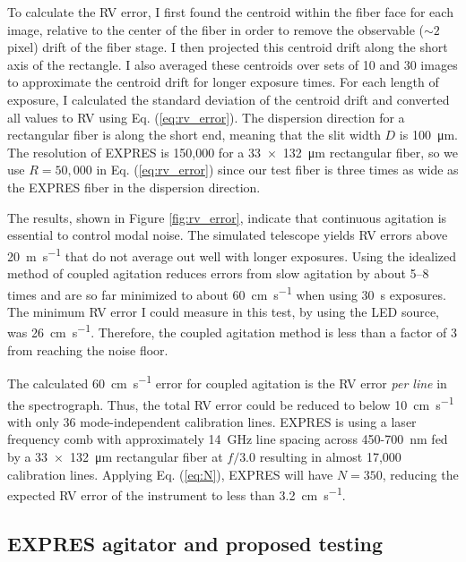 \documentclass[11pt]{article}
\begin{document}
To calculate the RV error, I first found the centroid within the fiber face for each image, relative to the center of the fiber in order to remove the observable ($\sim 2$ pixel) drift of the fiber stage. I then projected this centroid drift along the short axis of the rectangle. I also averaged these centroids over sets of 10 and 30 images to approximate the centroid drift for longer exposure times. For each length of exposure, I calculated the standard deviation of the centroid drift and converted all values to RV using Eq. (\ref{eq:rv_error}). The dispersion direction for a rectangular fiber is along the short end, meaning that the slit width $D$ is \SI{100}{\micro\meter}. The resolution of EXPRES is 150,000 for a \SI{33x132}{\micro\meter} rectangular fiber, so we use $R=50,000$ in Eq. (\ref{eq:rv_error}) since our test fiber is three times as wide as the EXPRES fiber in the dispersion direction.

The results, shown in Figure \ref{fig:rv_error}, indicate that continuous agitation is essential to control modal noise. The simulated telescope yields RV errors above \SI{20}{\meter\per\second} that do not average out well with longer exposures. Using the idealized method of coupled agitation reduces errors from slow agitation by about 5--8 times and are so far minimized to about \SI{60}{\centi\meter\per\second} when using \SI{30}{\second} exposures. The minimum RV error I could measure in this test, by using the LED source, was \SI{26}{\centi\meter\per\second}. Therefore, the coupled agitation method is less than a factor of 3 from reaching the noise floor.

The calculated \SI{60}{\centi\meter\per\second} error for coupled agitation is the RV error \textit{per line} in the spectrograph. Thus, the total RV error could be reduced to below \SI{10}{\centi\meter\per\second} with only 36 mode-independent calibration lines. EXPRES is using a laser frequency comb with approximately {\SI{14}{\giga\hertz}} line spacing across 450-{\SI{700}{\nano\meter}} fed by a {\SI{33x132}{\micro\meter}} rectangular fiber at $f/3.0$ resulting in almost 17,000 calibration lines. Applying Eq. (\ref{eq:N}), EXPRES will have $N=350$, reducing the expected RV error of the instrument to less than {\SI{3.2}{\centi\meter\per\second}}.

\subsection{EXPRES agitator and proposed testing}
\label{subsec:modal_noise_testing}
\end{document}
